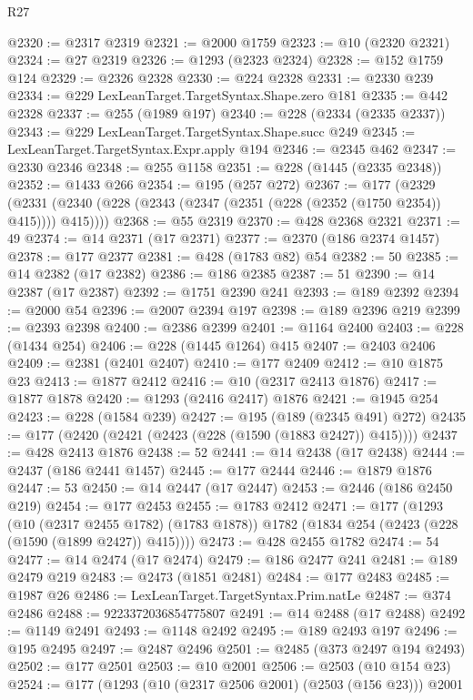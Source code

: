 \begin{lexlean}{R27}
\begin{coremodule}
@2320 := @2317 @2319
@2321 := @2000 @1759
@2323 := @10 (@2320 @2321)
@2324 := @27 @2319
@2326 := @1293 (@2323 @2324)
@2328 := @152 @1759 @124
@2329 := @2326 @2328
@2330 := @224 @2328
@2331 := @2330 @239
@2334 := @229 LexLeanTarget.TargetSyntax.Shape.zero @181
@2335 := @442 @2328
@2337 := @255 (@1989 @197)
@2340 := @228 (@2334 (@2335 @2337))
@2343 := @229 LexLeanTarget.TargetSyntax.Shape.succ @249
@2345 := LexLeanTarget.TargetSyntax.Expr.apply @194
@2346 := @2345 @462
@2347 := @2330 @2346
@2348 := @255 @1158
@2351 := @228 (@1445 (@2335 @2348))
@2352 := @1433 @266
@2354 := @195 (@257 @272)
@2367 := @177
    (@2329 (@2331 (@2340 (@228 (@2343 (@2347 (@2351 (@228 (@2352 (@1750 @2354)) @415)))) @415))))
@2368 := @55 @2319
@2370 := @428 @2368 @2321
@2371 := 49
@2374 := @14 @2371 (@17 @2371)
@2377 := @2370 (@186 @2374 @1457)
@2378 := @177 @2377
@2381 := @428 (@1783 @82) @54
@2382 := 50
@2385 := @14 @2382 (@17 @2382)
@2386 := @186 @2385
@2387 := 51
@2390 := @14 @2387 (@17 @2387)
@2392 := @1751 @2390 @241
@2393 := @189 @2392
@2394 := @2000 @54
@2396 := @2007 @2394 @197
@2398 := @189 @2396 @219
@2399 := @2393 @2398
@2400 := @2386 @2399
@2401 := @1164 @2400
@2403 := @228 (@1434 @254)
@2406 := @228 (@1445 @1264) @415
@2407 := @2403 @2406
@2409 := @2381 (@2401 @2407)
@2410 := @177 @2409
@2412 := @10 @1875 @23
@2413 := @1877 @2412
@2416 := @10 (@2317 @2413 @1876)
@2417 := @1877 @1878
@2420 := @1293 (@2416 @2417) @1876
@2421 := @1945 @254
@2423 := @228 (@1584 @239)
@2427 := @195 (@189 (@2345 @491) @272)
@2435 := @177 (@2420 (@2421 (@2423 (@228 (@1590 (@1883 @2427)) @415))))
@2437 := @428 @2413 @1876
@2438 := 52
@2441 := @14 @2438 (@17 @2438)
@2444 := @2437 (@186 @2441 @1457)
@2445 := @177 @2444
@2446 := @1879 @1876
@2447 := 53
@2450 := @14 @2447 (@17 @2447)
@2453 := @2446 (@186 @2450 @219)
@2454 := @177 @2453
@2455 := @1783 @2412
@2471 := @177
    (@1293
      (@10 (@2317 @2455 @1782) (@1783 @1878))
      @1782
      (@1834 @254 (@2423 (@228 (@1590 (@1899 @2427)) @415))))
@2473 := @428 @2455 @1782
@2474 := 54
@2477 := @14 @2474 (@17 @2474)
@2479 := @186 @2477 @241
@2481 := @189 @2479 @219
@2483 := @2473 (@1851 @2481)
@2484 := @177 @2483
@2485 := @1987 @26
@2486 := LexLeanTarget.TargetSyntax.Prim.natLe
@2487 := @374 @2486
@2488 := 9223372036854775807
@2491 := @14 @2488 (@17 @2488)
@2492 := @1149 @2491
@2493 := @1148 @2492
@2495 := @189 @2493 @197
@2496 := @195 @2495
@2497 := @2487 @2496
@2501 := @2485 (@373 @2497 @194 @2493)
@2502 := @177 @2501
@2503 := @10 @2001
@2506 := @2503 (@10 @154 @23)
@2524 := @177
    (@1293
      (@10 (@2317 @2506 @2001) (@2503 (@156 @23)))
      @2001

\end{coremodule}
\end{lexlean}
